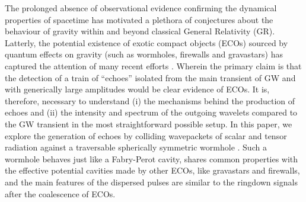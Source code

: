 \documentclass[article,aps,nofootinbib,twocolumn,superscriptaddress]{revtex4-1}
\begin{document}
The prolonged absence of observational evidence confirming the dynamical properties of spacetime has motivated a plethora of conjectures about the behaviour of gravity within and beyond \citep{Clifton:2011jh, Taliotis:2012sx, Joyce:2014kja} classical General Relativity (GR). Latterly, the potential existence of exotic compact objects (ECOs) sourced by quantum effects on gravity \citep{PhysRevLett.61.1446, Almheiri:2012rt, Mazur:2001fv} (such as wormholes, firewalls and gravastars) has captured the attention of many recent efforts \citep{Cardoso:2016oxy, Abedi:2016hgu, Abedi:2018npz}. Wherein the primary claim is that the detection of a train of ``echoes'' isolated from the main transient of GW and with generically large amplitudes would be clear evidence of ECOs. It is, therefore, necessary to understand (i) the mechanisms behind the production of echoes and (ii) the intensity and spectrum of the outgoing wavelets compared to the GW transient in the most straightforward possible setup. In this paper, we explore the generation of echoes by colliding wavepackets of scalar and tensor radiation against a traversable spherically symmetric wormhole \citep{Visser:1989kh}. Such a wormhole behaves just like a Fabry-Perot cavity, shares common properties with the effective potential cavities made by other ECOs, like gravastars and firewalls, and the main features of the dispersed pulses are similar to the ringdown signals after the coalescence of ECOs.
\end{document}
